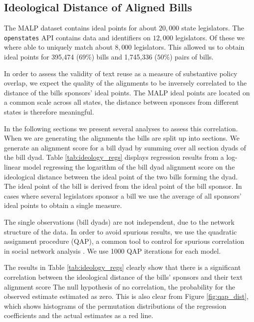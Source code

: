 \documentclass[12pt]{article} %
\begin{document}
\subsection{Ideological Distance of Aligned Bills}


The MALP dataset contains ideal points for about $20,000$ state legislators. The \texttt{openstates} API contains data and identifiers on $12,000$ legislators. Of these we where able to uniquely match about $8,000$ legislators. This allowed us to obtain ideal points for 395,474 ($69\%$) bills and 1,745,336 ($50\%$) pairs of bills. 

In order to assess the validity of text reuse as a measure of substantive policy overlap, we expect the quality of the alignments to be inversely correlated to the distance of the bills sponsors' ideal points. The MALP ideal points are located on a common scale across all states, the distance between sponsors from different states is therefore meaningful. 

In the following sections we present several analyses to assess this correlation. When we are generating the alignments the bills are split up into sections. We generate an alignment score for a bill dyad by summing over all section dyads of the bill dyad.  Table \ref{tab:ideology_regs} displays regression results from a log-linear model regressing the logarithm of the bill dyad alignment score on the ideological distance between the ideal point of the two bills forming the dyad. The ideal point of the bill is derived from the ideal point of the bill sponsor. In cases where several legislators sponsor a bill we use the average of all sponsors' ideal points to obtain a single measure.

The single observations (bill dyads) are not independent, due to the network structure of the data. In order to avoid spurious results, we use the quadratic assignment procedure (QAP), a common tool to control for spurious correlation in social network analysis \citet{krackardt1987qap}. We use 1000 QAP iterations for each model.



The results in Table \ref{tab:ideology_regs} clearly show that there is a significant correlation between the ideological distance of the bills' sponsors and their text alignment score The null hypothesis of no correlation, the probability for the observed estimate estimated as zero. This is also clear from Figure \ref{fig:qap_dist}, which shows histograms of the permutation distributions of the regression coefficients and the actual estimates as a red line. 
\end{document}
